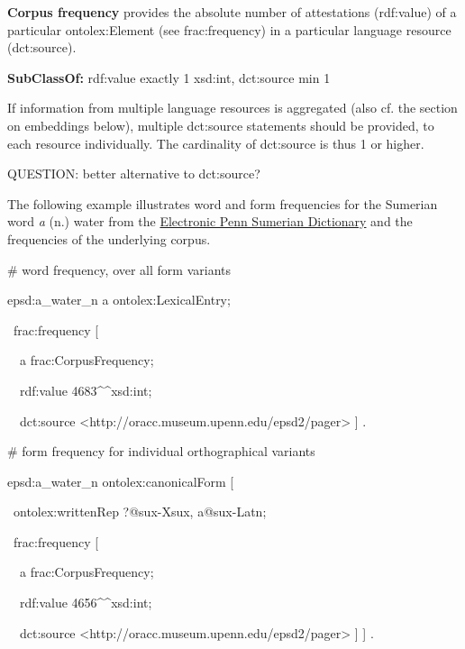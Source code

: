 \documentclass[a4paper]{article}
\newcommand\textstyleInternetlink[1]{\textcolor[rgb]{0.0,0.0,0.5019608}{#1}}
\newcommand\textstyleSourceText[1]{\textrm{#1}}
\newcommand\textstyleStrongEmphasis[1]{\textbf{#1}}
\newcommand\textstyleTeletype[1]{\textrm{#1}}
\begin{document}
\textstyleStrongEmphasis{Corpus frequency} provides the absolute number of attestations (rdf:value) of a particular ontolex:Element (see frac:frequency) in a particular language resource (dct:source).

\textstyleStrongEmphasis{SubClassOf:} rdf:value exactly 1 xsd:int, dct:source min 1

If information from multiple language resources is aggregated (also cf. the section on embeddings below), multiple \textstyleTeletype{dct:source} statements should be provided, to each resource individually. The cardinality of \textstyleTeletype{dct:source} is thus 1 or higher. 

QUESTION: better alternative to dct:source?

The following example illustrates word and form frequencies for the Sumerian word \textit{a} (n.) {\textquotedbl}water{\textquotedbl} from the \href{http://oracc.museum.upenn.edu/epsd2/sux}{\textstyleInternetlink{Electronic Penn Sumerian Dictionary}} and the frequencies of the underlying corpus. 

%
%
%


\textstyleSourceText{\# word frequency, over all form variants}

\textstyleSourceText{epsd:a\_water\_n a ontolex:LexicalEntry;}

\textstyleSourceText{\ frac:frequency [ }

\textstyleSourceText{\ \ a frac:CorpusFrequency;}

\textstyleSourceText{\ \ rdf:value {\textquotedbl}4683{\textquotedbl}\^{}\^{}xsd:int;}

\textstyleSourceText{\ \ dct:source {\textless}http://oracc.museum.upenn.edu/epsd2/pager{\textgreater} ] .}


\bigskip

\textstyleSourceText{\# form frequency for individual orthographical variants}

\textstyleSourceText{epsd:a\_water\_n ontolex:canonicalForm [}

\textstyleSourceText{\ ontolex:writtenRep {\textquotedbl}?{\textquotedbl}@sux-Xsux, {\textquotedbl}a{\textquotedbl}@sux-Latn;}

\textstyleSourceText{\ frac:frequency [}

\textstyleSourceText{\ \ a frac:CorpusFrequency;}

\textstyleSourceText{\ \ rdf:value {\textquotedbl}4656{\textquotedbl}\^{}\^{}xsd:int;}

\textstyleSourceText{\ \ dct:source {\textless}http://oracc.museum.upenn.edu/epsd2/pager{\textgreater} ] ] .}
\end{document}
